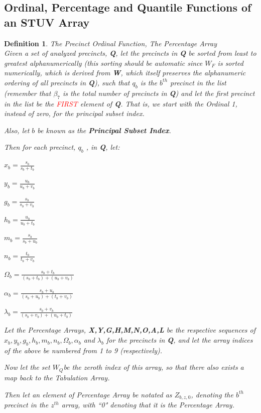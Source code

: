 \documentclass[preprint,13pt]{elsarticle}
\newtheorem{definition}{Definition}[section]
\begin{document}
\subsection{Ordinal, Percentage and Quantile Functions of an STUV Array}
\begin{definition}{The Precinct Ordinal Function, The Percentage Array}\\
Given a set of analyzed precincts, \textbf{Q}, let the precincts in \textbf{Q} be sorted from least to greatest alphanumerically (this sorting should be automatic since $W_{F}$ is sorted numerically, which is derived from \textbf{W}, which itself preserves the alphanumeric ordering of all precincts in \textbf{Q}), such that $q_{b}$ is the $b^{th}$ precinct in the list (remember that $\beta_{7}$ is the total number of precincts in \textbf{Q}) and let the first precinct in the list be the \textcolor{red}{FIRST} element of \textbf{Q}. That is, we start with the Ordinal 1, instead of zero, for the principal subset index.

Also, let $b$ be known as the \textbf{Principal Subset Index}.

Then for each precinct, $q_{b}$ , in \textbf{Q}, let:

$x_{b}=\frac{s_{b}}{s_{b}+t_{b}}$

$y_{b}=\frac{u_{b}}{u_{b}+v_{b}}$

$g_{b}=\frac{s_{b}}{s_{b}+v_{b}}$

$h_{b}=\frac{u_{b}}{u_{b}+t_{b}}$

$m_{b}=\frac{s_{b}}{s_{b}+u_{b}}$

$n_{b}=\frac{t_{b}}{t_{b}+v_{b}}$

$\Omega_{b}=\frac{s_{b}+t_{b}}{(s_{b}+t_{b})+(u_{b}+v_{b})}$

$\alpha_{b}=\frac{s_{b}+u_{b}}{(s_{b}+u_{b})+(t_{b}+v_{b})}$

$\lambda_{b}=\frac{s_{b}+v_{b}}{(s_{b}+v_{b})+(u_{b}+t_{b})}$

Let the Percentage Arrays, \textbf{X,Y,G,H,M,N,O,A,L} be the respective sequences of $x_{b}, y_{b}, g_{b}, h_{b}, m_{b}, n_{b}, \Omega_{b}, \alpha_{b}$ and $\lambda_{b}$ for the precincts in \textbf{Q}, and let the array indices of the above be numbered from 1 to 9 (respectively).

Now let the set $W_{Q}$be the zeroth index of this array, so that there also exists a map back to the Tabulation Array.

Then let an element of Percentage Array be notated as $Z_{b,z,0}$, denoting the $b^{th}$ precinct in the $z^{th}$ array, with ``0" denoting that it is the Percentage Array.


\end{definition}
\end{document}
